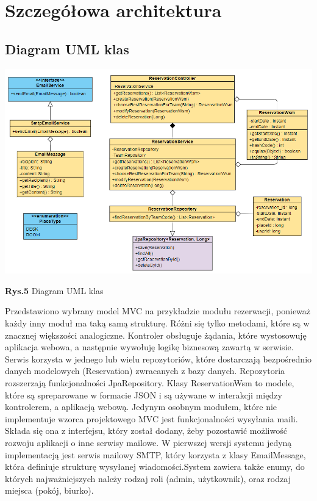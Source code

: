 \documentclass{article}
\begin{document}
\section{Szczegółowa architektura}

\subsection{Diagram UML klas}
\hspace*{-3cm}\includegraphics[scale=0.7]{uml_diagram}
\begin{center}\textbf{Rys.5} Diagram UML klas \end{center}
Przedstawiono wybrany model MVC na przykładzie modułu rezerwacji, ponieważ każdy inny moduł ma taką samą strukturę. Różni się tylko metodami, które są w znacznej większości analogiczne. Kontroler obsługuje żądania, które wystosowuję aplikacja webowa, a następnie wywołuję logikę biznesową zawartą w serwisie. Serwis korzysta w jednego lub wielu repozytoriów, które dostarczają bezpośrednio danych modelowych (Reservation) zwracanych z bazy danych. Repozytoria rozszerzają funkcjonalności JpaRepository. Klasy ReservationWsm to modele, które są spreparowane w formacie JSON i są używane w interakcji między kontrolerem, a aplikacją webową. Jedynym osobnym modułem, które nie implementuje wzorca projektowego MVC jest funkcjonalności wysyłania maili. Składa się ona z interfejsu, który został dodany, żeby pozostawić możliwość rozwoju aplikacji o inne serwisy mailowe. W pierwszej wersji systemu jedyną implementacją jest serwis mailowy SMTP, który korzysta z klasy EmailMessage, która definiuje strukturę wysyłanej wiadomości.System zawiera także enumy, do których najważniejszych należy rodzaj roli (admin, użytkownik), oraz rodzaj miejsca (pokój, biurko).
\end{document}
